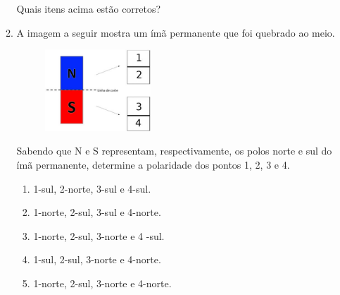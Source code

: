 \documentclass[12pt,letterpaper,fleqn]{article}
\begin{document}
\begin{itemize}
\begin{enumerate}
            Quais itens acima estão corretos?
            
            \item
            A imagem a seguir mostra um ímã permanente que foi quebrado ao meio.
            
            \begin{figure}[h]
                \centering
                \includegraphics[width=0.4\textwidth]{ex_5.jpg}
            \end{figure}
            
            Sabendo que N e S representam, respectivamente, os polos norte e sul do ímã permanente, determine a polaridade dos pontos 1, 2, 3 e 4.
            
            \begin{enumerate}
                \item 1-sul, 2-norte, 3-sul e 4-sul. 
                \item 1-norte, 2-sul, 3-sul e 4-norte.
                \item 1-norte, 2-sul, 3-norte e 4 -sul.
                \item 1-sul, 2-sul, 3-norte e 4-norte.
                \item 1-norte, 2-sul, 3-norte e 4-norte.
            \end{enumerate}
        \end{enumerate}
        
    \end{itemize}
    \pagebreak
\end{document}
